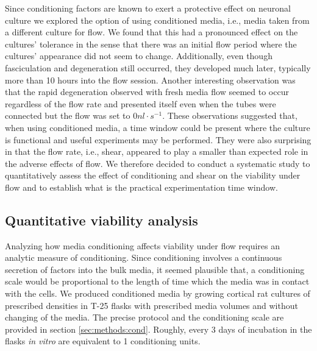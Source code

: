     Since conditioning factors are known to exert a protective effect on neuronal culture \cite{kaech2006culturing,banker1980trophic} we explored the option of using conditioned media, i.e., media taken from a different culture for flow. We found that this had a pronounced effect on the cultures' tolerance in the sense that there was an initial flow period where the cultures' appearance did not seem to change. Additionally, even though fasciculation and degeneration still occurred, they developed much later, typically more than 10 hours into the flow session. Another interesting observation was that the rapid degeneration observed with fresh media flow seemed to occur regardless of the flow rate and presented itself even when the tubes were connected but the flow was set to \(0 nl\cdot s^{-1}\). These observations suggested that, when using conditioned media, a time window could be present where the culture is functional and useful experiments may be performed. They were also surprising in that the flow rate, i.e., shear, appeared to play a smaller than expected role in the adverse effects of flow. We therefore decided to conduct a systematic study to quantitatively assess the effect of conditioning and shear on the viability under flow and to establish what is the practical experimentation time window.


    \subsection{Quantitative viability analysis}
    \label{sec:devices:viabilityAssay}
    Analyzing how media conditioning affects viability under flow requires an analytic measure of conditioning. Since conditioning involves a continuous secretion of factors into the bulk media, it seemed plausible that, a conditioning scale would be proportional to the length of time which the media was in contact with the cells. We produced conditioned media by growing cortical rat cultures of prescribed densities in T-25 flasks with prescribed media volumes and without changing of the media. The precise protocol and the conditioning scale are provided in section \ref{sec:methods:cond}. Roughly, every 3 days of incubation in the flasks \textit{in vitro} are equivalent to 1 conditioning units.

